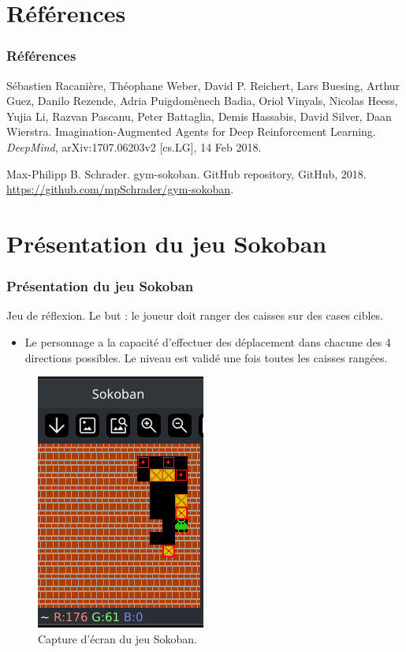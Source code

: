 \documentclass[
	11pt, %
]{beamer}
\begin{document}
\section{Références}
\begin{frame}
    \frametitle{Références}
    
    \begin{thebibliography}{9}
        
        Sébastien Racanière, Théophane Weber, David P. Reichert, Lars Buesing, Arthur Guez, Danilo Rezende, Adria Puigdomènech Badia, Oriol Vinyals, Nicolas Heess, Yujia Li, Razvan Pascanu, Peter Battaglia, Demis Hassabis, David Silver, Daan Wierstra.
        \newblock Imagination-Augmented Agents for Deep Reinforcement Learning.
        \newblock \textit{DeepMind}, arXiv:1707.06203v2 [cs.LG], 14 Feb 2018.
        
        Max-Philipp B. Schrader.
        \newblock gym-sokoban.
        \newblock GitHub repository, GitHub, 2018.
        \newblock \url{https://github.com/mpSchrader/gym-sokoban}.
        
    \end{thebibliography}
\end{frame}


\section{Présentation du jeu Sokoban}

\begin{frame}
	\frametitle{Présentation du jeu Sokoban}

	Jeu de \alert{réflexion}. Le but : le joueur doit ranger des caisses sur des cases cibles.
	\smallskip %

	\begin{itemize}
		\item Le personnage a la capacité d'effectuer des déplacement dans chacune des 4 directions possibles. Le niveau est validé une fois toutes les caisses rangées.
	\end{itemize}

	\smallskip %

	\begin{figure}
		\includegraphics[width=0.2\linewidth]{Images/sokaibanfailed2.png}
		\caption{Capture d'écran du jeu Sokoban.}
	\end{figure}	

\end{frame}
\end{document}
